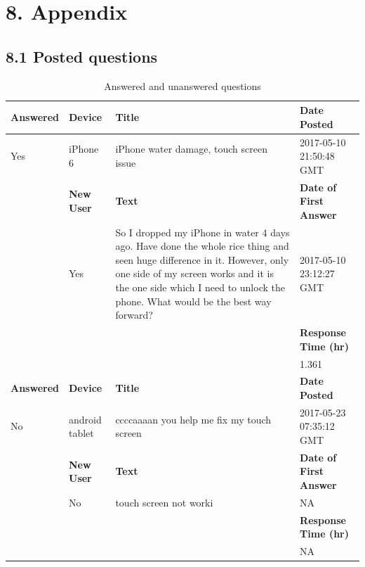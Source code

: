 \documentclass{article}
\begin{document}

\section*{8. Appendix} 

\subsection*{8.1 Posted questions}

\begin{table}[!htbp]
\centering
\begin{tabular}{| l | l | p{6cm} | l |}
  \hline
 \textbf{Answered} & \textbf{Device} & \textbf{Title} & \textbf{Date Posted} \\
  \hline
  Yes & iPhone 6 & iPhone water damage, touch screen issue &  2017-05-10 21:50:48 GMT \\ \cline{2 - 4}
  & \textbf{New User} & \textbf{Text} & \textbf{Date of First Answer} \\ \cline{2 - 4}
  & Yes & So I dropped my iPhone in water 4 days ago. Have done the whole rice thing and seen huge difference in it. However, only one side of my screen works and it is the one side which I need to unlock the phone. What would be the best way forward? & 2017-05-10 23:12:27 GMT \\ \cline{4 - 4}
  & & & \textbf{Response Time (hr)} \\ \cline{4 - 4}
  & & & 1.361 \\ \cline{4-4} \hline
  \textbf{Answered} & \textbf{Device} & \textbf{Title} & \textbf{Date Posted} \\ \cline{1 - 4}
  No & android tablet & ccccaaaan you help me fix my touch screen & 2017-05-23 07:35:12 GMT \\ \cline{2 - 4}
  & \textbf{New User} & \textbf{Text} & \textbf{Date of First Answer} \\ \cline{2 - 4}
  & No & touch screen not worki & NA \\ \cline{4 - 4}
  & & & \textbf{Response Time (hr)} \\ \cline{4 - 4}
  & & & NA \\ 
   \hline
\end{tabular}
\caption{Answered and unanswered questions}
\label{table:questions}
\end{table}
\end{document}
